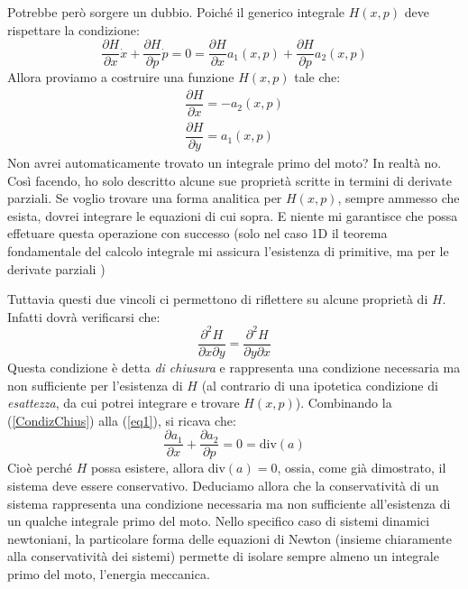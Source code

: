 \documentclass[a4paper,openany]{article}
\begin{document}
	Potrebbe però sorgere un dubbio. Poiché il generico integrale $H(x,p)$ deve rispettare la condizione:
	$$
	\dfrac{\partial H}{\partial x}\dot{x} + \dfrac{\partial H}{\partial p}\dot{p} = 0 = \dfrac{\partial H}{\partial x}a_{1}(x,p) + \dfrac{\partial H}{\partial p}a_{2}(x,p)
	$$
	Allora proviamo a costruire una funzione $H(x,p)$ tale che:
	\begin{equation}\begin{split}
			\dfrac{\partial H}{\partial x} = -a_{2}(x,p) \\
			\dfrac{\partial H}{\partial y} = a_{1}(x,p)
			\label{eq1}
	\end{split}\end{equation}
	Non avrei automaticamente trovato un integrale primo del moto? In realtà no. Così facendo, ho solo descritto alcune sue proprietà scritte in termini di derivate parziali. Se voglio trovare una forma analitica per $H(x,p)$, sempre ammesso che esista, dovrei integrare le equazioni di cui sopra. E niente mi garantisce che possa effetuare questa operazione con successo (solo nel caso 1D il teorema fondamentale del calcolo integrale mi assicura l'esistenza di primitive, ma per le derivate parziali )
	
	Tuttavia questi due vincoli ci permettono di riflettere su alcune proprietà di $H$. Infatti dovrà verificarsi che:
	\begin{equation}
		\dfrac{\partial^{2}H}{\partial x \partial y} = \dfrac{\partial^{2}H}{\partial y \partial x}
		\label{CondizChius}
	\end{equation}
	Questa condizione è detta \textit{di chiusura} e rappresenta una condizione necessaria ma non sufficiente per l'esistenza di $H$ (al contrario di una ipotetica condizione di \textit{esattezza}, da cui potrei integrare e trovare $H(x,p)$). Combinando la (\ref{CondizChius}) alla (\ref{eq1}), si ricava che:
	$$
	\dfrac{\partial a_{1}}{\partial x} + \dfrac{\partial a_{2}}{\partial p} = 0 = \mbox{div}(a)
	$$
	Cioè perché $H$ possa esistere, allora div$(a) = 0$, ossia, come già dimostrato, il sistema deve essere conservativo. Deduciamo allora che la conservatività di un sistema rappresenta una condizione necessaria ma non sufficiente all'esistenza di un qualche integrale primo del moto. Nello specifico caso di sistemi dinamici newtoniani, la particolare forma delle equazioni di Newton (insieme chiaramente alla conservatività dei sistemi) permette di isolare sempre almeno un integrale primo del moto, l'energia meccanica.
	
	
\end{document}
